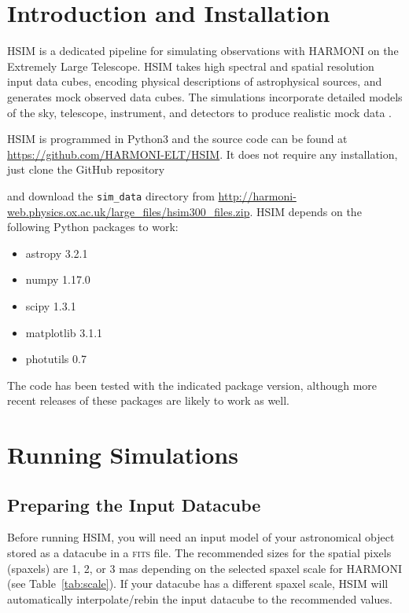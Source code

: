 \documentclass[12pt]{report}
\begin{document}
\section{Introduction and Installation}

HSIM is a dedicated pipeline for simulating observations with HARMONI on the Extremely Large Telescope. HSIM takes high spectral and spatial resolution input data cubes, encoding physical descriptions of astrophysical sources, and generates mock observed data cubes. The simulations incorporate detailed models of the sky, telescope, instrument, and detectors to produce realistic mock data \citep{Zieleniewski2015}.

HSIM is programmed in Python3 and the source code can be found at \url{https://github.com/HARMONI-ELT/HSIM}. It does not require any installation, just clone the GitHub repository 


and download the \texttt{sim\_data} directory from \url{http://harmoni-web.physics.ox.ac.uk/large_files/hsim300_files.zip}. HSIM depends on the following Python packages to work:

\begin{itemize}
\setlength\itemsep{-0.5ex}
\item astropy 3.2.1
\item numpy 1.17.0
\item scipy 1.3.1
\item matplotlib 3.1.1
\item photutils 0.7
\end{itemize}

The code has been tested with the indicated package version, although more recent releases of these packages are likely to work as well.


\section{Running Simulations}

\subsection{Preparing the Input Datacube}

Before running HSIM, you will need an input model of your astronomical object stored as a datacube in a \textsc{fits} file. The recommended sizes for the spatial pixels (spaxels) are 1, 2, or 3 mas depending on the selected spaxel scale for HARMONI (see Table~\ref{tab:scale}). If your datacube has a different spaxel scale, HSIM will automatically interpolate\slash rebin the input datacube to the recommended values.
\end{document}
